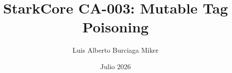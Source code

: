 \documentclass{article}
\begin{document}
\title{StarkCore CA-003: Mutable Tag Poisoning}
\author{Luis Alberto Burciaga Miker}
\date{Julio 2026}
\maketitle
\end{document}
